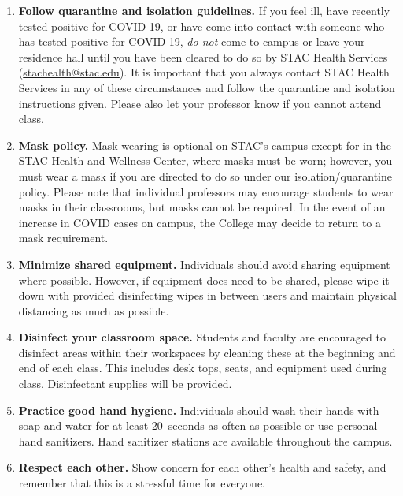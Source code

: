 \documentclass[11pt,letterpaper]{article}
\begin{document}
	\begin{enumerate}[1.]
	\item {\bfseries Follow quarantine and isolation guidelines.} If you feel ill, have recently tested positive for COVID-19, or have come into contact with someone who has tested positive for COVID-19, {\itshape do not} come to campus or leave your residence hall until you have been cleared to do so by STAC Health Services (\url{stachealth@stac.edu}). It is important that you always contact STAC Health Services in any of these circumstances and follow the quarantine and isolation instructions given. Please also let your professor know if you cannot attend class. 

	\item {\bfseries Mask policy.} Mask-wearing is optional on STAC's campus except for in the STAC Health and Wellness Center, where masks must be worn; however, you must wear a mask if you are directed to do so under our isolation/quarantine policy. Please note that individual professors may encourage students to wear masks in their classrooms, but masks cannot be required. In the event of an increase in COVID cases on campus, the College may decide to return to a mask requirement. 

	\item {\bfseries Minimize shared equipment.} Individuals should avoid sharing equipment where possible. However, if equipment does need to be shared, please wipe it down with provided disinfecting wipes in between users and maintain physical distancing as much as possible.

	\item {\bfseries Disinfect your classroom space.} Students and faculty are encouraged to disinfect areas within their workspaces by cleaning these at the beginning and end of each class. This includes desk tops, seats, and equipment used during class. Disinfectant supplies will be provided. 

	\item {\bfseries Practice good hand hygiene.} Individuals should wash their hands with soap and water for at least 20~seconds as often as possible or use personal hand sanitizers. Hand sanitizer stations are available throughout the campus.

	\item {\bfseries Respect each other.} Show concern for each other's health and safety, and remember that this is a stressful time for everyone.
	\end{enumerate} \sectionbreak
\end{document}
